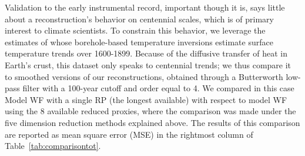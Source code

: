 \documentclass[12pt]{amsart}
\theoremstyle{plain}
\theoremstyle{definition}
\theoremstyle{remark}
\begin{document}
Validation to the early instrumental record, important though it is, says little about a reconstruction's behavior on centennial scales, which is of primary interest to climate scientists. To constrain this behavior, we leverage the estimates of \citet[hereafter, PS04]{Pollack2004} whose borehole-based
temperature inversions estimate surface temperature trends over 1600-1899. Because of the diffusive transfer of heat in Earth's crust, this dataset only speaks to centennial trends; we thus compare it to smoothed versions of our reconstructions, obtained through a Butterworth low-pass filter with a 100-year cutoff and order equal to 4. We compared in this case Model WF with a single RP (the longest available) with respect to model WF using the 8 available reduced proxies, where the comparison was made under the five dimension reduction methods explained above. The results of this comparison are reported as mean square error (MSE) in the rightmost column of Table~\ref{tab:comparisontot}.
\end{document}
